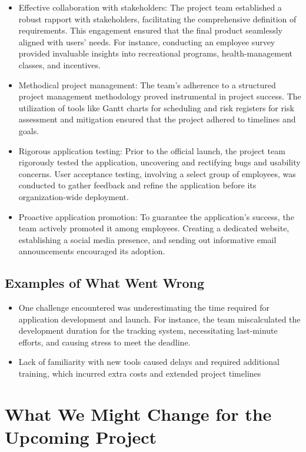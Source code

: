 \begin{itemize}
    \item Effective collaboration with stakeholders: The project team established a robust rapport with stakeholders, facilitating the comprehensive definition of requirements. This engagement ensured that the final product seamlessly aligned with users' needs. For instance, conducting an employee survey provided invaluable insights into recreational programs, health-management classes, and incentives.
    \item Methodical project management: The team's adherence to a structured project management methodology proved instrumental in project success. The utilization of tools like Gantt charts for scheduling and risk registers for risk assessment and mitigation ensured that the project adhered to timelines and goals.
    \item Rigorous application testing: Prior to the official launch, the project team rigorously tested the application, uncovering and rectifying bugs and usability concerns. User acceptance testing, involving a select group of employees, was conducted to gather feedback and refine the application before its organization-wide deployment.
    \item Proactive application promotion: To guarantee the application's success, the team actively promoted it among employees. Creating a dedicated website, establishing a social media presence, and sending out informative email announcements encouraged its adoption.
\end{itemize}

\subsection{Examples of What Went Wrong}

\begin{itemize}
    \item One challenge encountered was underestimating the time required for application development and launch. For instance, the team miscalculated the development duration for the tracking system, necessitating last-minute efforts, and causing stress to meet the deadline.
    \item Lack of familiarity with new tools caused delays and required additional training, which incurred extra costs and extended project timelines
\end{itemize}

\section{What We Might Change for the Upcoming Project}

